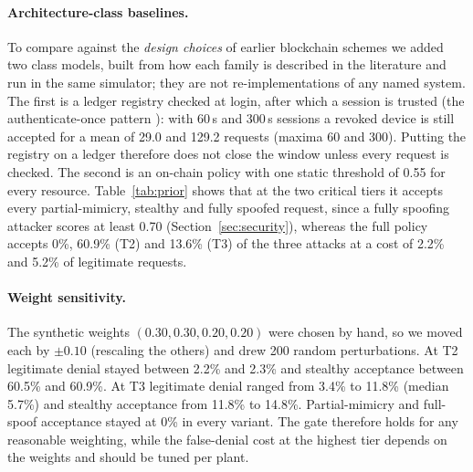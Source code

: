 \paragraph{Architecture-class baselines.}\label{sec:prior_eval} To compare against the \emph{design choices} of earlier blockchain schemes we added two class models, built from how each family is described in the literature and run in the same simulator; they are not re-implementations of any named system. The first is a ledger registry checked at login, after which a session is trusted (the authenticate-once pattern \cite{wang2026medicaliot,james2024authz}): with 60\,s and 300\,s sessions a revoked device is still accepted for a mean of 29.0 and 129.2 requests (maxima 60 and 300). Putting the registry on a ledger therefore does not close the window unless every request is checked. The second is an on-chain policy with one static threshold of 0.55 for every resource. Table~\ref{tab:prior} shows that at the two critical tiers it accepts every partial-mimicry, stealthy and fully spoofed request, since a fully spoofing attacker scores at least 0.70 (Section~\ref{sec:security}), whereas the full policy accepts 0\%, 60.9\% (T2) and 13.6\% (T3) of the three attacks at a cost of 2.2\% and 5.2\% of legitimate requests.

\begin{table}[t]
\centering
\caption{Static single-threshold on-chain policy (class model) versus the full policy at the two critical tiers (synthetic fleet, 4{,}000 requests per population)}
\label{tab:prior}
\scriptsize
\setlength{\tabcolsep}{2.5pt}

\end{table}

\paragraph{Weight sensitivity.} The synthetic weights $(0.30,0.30,0.20,0.20)$ were chosen by hand, so we moved each by $\pm0.10$ (rescaling the others) and drew 200 random perturbations. At T2 legitimate denial stayed between 2.2\% and 2.3\% and stealthy acceptance between 60.5\% and 60.9\%. At T3 legitimate denial ranged from 3.4\% to 11.8\% (median 5.7\%) and stealthy acceptance from 11.8\% to 14.8\%. Partial-mimicry and full-spoof acceptance stayed at 0\% in every variant. The gate therefore holds for any reasonable weighting, while the false-denial cost at the highest tier depends on the weights and should be tuned per plant.

